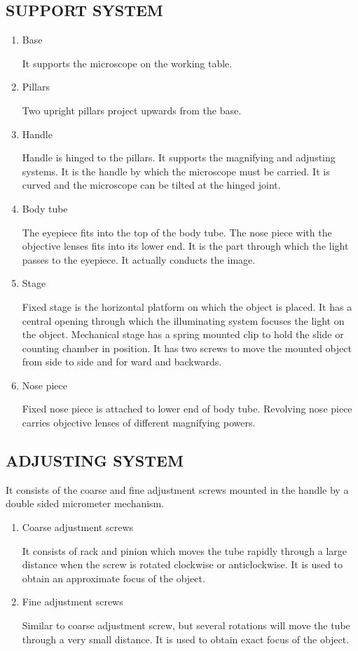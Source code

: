 \documentclass{book}
\begin{document}
		\subsection{SUPPORT SYSTEM}
		\begin{enumerate}
		\item{Base \par It supports the microscope on the working table.}
		\item{Pillars \par Two upright pillars project upwards from the base.}
		\item{Handle \par Handle is hinged to the pillars. It supports the magnifying and adjusting systems. It is the handle by which the microscope must be carried. It is curved and the microscope can be tilted at the hinged joint.}
		\item{Body tube \par The eyepiece fits into the top of the body tube. The nose piece with the objective lenses fits into its lower end. It is the part through which the light passes to the eyepiece. It actually conducts the image.}
		\item{Stage \par Fixed stage is the horizontal platform on which the object is placed. It has a central opening through which the illuminating system focuses the light on the object. Mechanical stage has a spring mounted clip to hold the slide or counting chamber in position. It has two screws to move the mounted object from side to side and for ward and backwards.}
		\item {Nose piece \par Fixed nose piece is attached to lower end of body tube. Revolving nose piece carries objective lenses of different magnifying powers.}
		\end{enumerate}

		\subsection{ADJUSTING SYSTEM}
		It consists of the coarse and fine adjustment screws mounted in the handle by a double sided micrometer mechanism.
		\begin{enumerate}
		\item{Coarse adjustment screws \par It consists of rack and pinion which moves the tube rapidly through a large distance when the screw is rotated clockwise or anticlockwise. It is used to obtain an approximate focus of the object.}
		\item{Fine adjustment screws \par Similar to coarse adjustment screw, but several rotations will move the tube through a very small distance. It is used to obtain exact focus of the object.}
		\end{enumerate}
\end{document}
